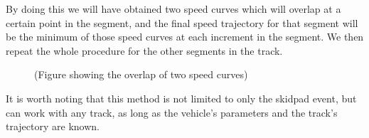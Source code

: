 \documentclass[a4paper, 11pt]{article}
\begin{document}
By doing this we will have obtained two speed curves which will overlap at a certain point in the segment, and the final speed trajectory for that segment will be the minimum of those speed curves at each increment in the segment. We then repeat the whole procedure for the other segments in the track.

\begin{figure}[H]
	\centering
	(Figure showing the overlap of two speed curves)
\end{figure}

It is worth noting that this method is not limited to only the skidpad event, but can work with any track, as long as the vehicle's parameters and the track's trajectory
are known.
\end{document}

